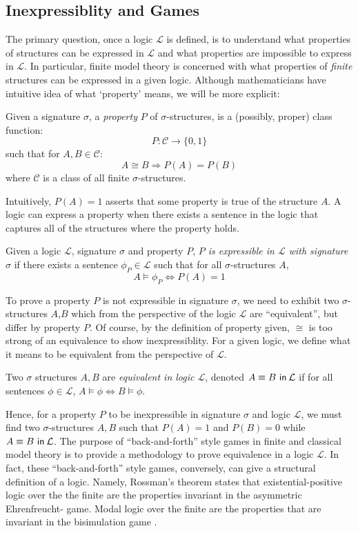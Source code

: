 \subsection{Inexpressiblity and Games}
The primary question, once a logic $\mathcal{L}$ is defined, is to understand what properties of structures can be expressed in $\mathcal{L}$ and what properties are impossible to express in $\mathcal{L}$. In particular, finite model theory is concerned with what properties of \textit{finite} structures can be expressed in a given logic. Although mathematicians have intuitive idea of what `property' means, we will be more explicit:
\begin{defn}
Given a signature $\sigma$, a \textit{property} $P$ of $\sigma$-structures, is a (possibly, proper) class function:
$$P:\mathcal{C} \longrightarrow \{0,1\}$$
such that for $A,B \in \mathcal{C}$:
$$A \cong B \Rightarrow P(A) = P(B)$$ 
where $\mathcal{C}$ is a class of all finite $\sigma$-structures.
\end{defn}
Intuitively, $P(A) = 1$ asserts that some property is true of the structure $A$. A logic can express a property when there exists a sentence in the logic that captures all of the structures where the property holds. 
\begin{defn}
Given a logic $\mathcal{L}$, signature $\sigma$ and property $P$, \textit{$P$ is expressible in $\mathcal{L}$ with signature $\sigma$} if there exists a sentence $\phi_{P} \in \mathcal{L}$ such that for all $\sigma$-structures $A$,
$$A \vDash \phi_{P} \Leftrightarrow P(A) = 1$$
\end{defn}
To prove a property $P$ is not expressible in signature $\sigma$, we need to exhibit two $\sigma$-structures $A$,$B$ which from the perspective of the logic $\mathcal{L}$ are ``equivalent'', but differ by property $P$. Of course, by the definition of property given, $\cong$ is too strong of an equivalence to show inexpressiblity. For a given logic, we define what it means to be equivalent from the perspective of $\mathcal{L}$.  
\begin{defn}
Two $\sigma$ structures $A,B$ are \textit{equivalent in logic $\mathcal{L}$}, denoted ${A \equiv B \ \mathsf{in}\: \mathcal{L}}$ if for all sentences $\phi \in \mathcal{L}$, $A \vDash \phi \Leftrightarrow B \vDash \phi$.  
\label{defn:equivLogic}
\end{defn}
Hence, for a property $P$ to be inexpressible in signature $\sigma$ and logic $\mathcal{L}$, we must find two $\sigma$-structures $A,B$ such that $P(A) = 1$ and $P(B) = 0$ while ${A \equiv B \ \mathsf{in}\: \mathcal{L}}$. The purpose of ``back-and-forth'' style games in finite and classical model theory is to provide a methodology to prove equivalence in a logic $\mathcal{L}$. In fact, these ``back-and-forth'' style games, conversely, can give a structural definition of a logic. Namely, Rossman's theorem \cite{Rossman2008} states that existential-positive logic over the the finite are the properties invariant in the asymmetric Ehrenfreucht-{\Fraisse} game. Modal logic over the finite are the properties that are invariant in the bisimulation game \cite{Gradel2014}.   
